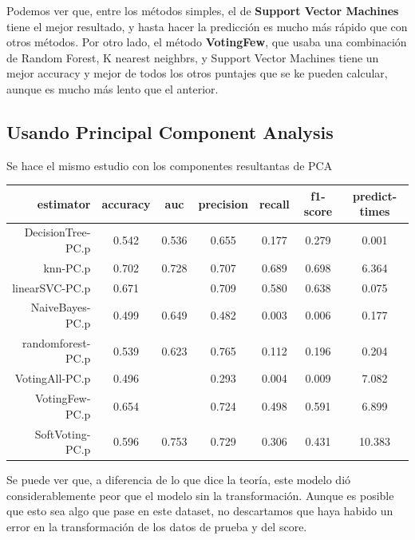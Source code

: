 \documentclass{article}
\begin{document}
Podemos ver que, entre los métodos simples, el de \textbf{Support Vector Machines} tiene el mejor resultado, y hasta hacer la predicción es mucho más rápido que con otros métodos. Por otro lado, el método \textbf{VotingFew}, que usaba una combinación de Random Forest, K nearest neighbrs, y Support Vector Machines tiene un mejor accuracy y mejor de todos los otros puntajes que se ke pueden calcular, aunque es mucho más lento que el anterior.

\subsection{Usando Principal Component Analysis}

Se hace el mismo estudio con los componentes resultantas de PCA

\begin{center}
\begin{tabular}{r c c c c c c}
	\toprule
	\textbf{estimator} & \textbf{accuracy} & \textbf{auc} & \textbf{precision} & \textbf{recall} & \textbf{f1-score} & \textbf{predict-times} \\
	\midrule
	DecisionTree-PC.p & 0.542 & 0.536 & 0.655 & 0.177 & 0.279 & 0.001 \\
	knn-PC.p & 0.702 & 0.728 & 0.707 & 0.689 & 0.698 & 6.364 \\
	linearSVC-PC.p & 0.671 & \footnotemark[1] & 0.709 & 0.580 & 0.638 & 0.075 \\
	NaiveBayes-PC.p & 0.499 & 0.649 & 0.482 & 0.003 & 0.006 & 0.177 \\
	randomforest-PC.p & 0.539 & 0.623 & 0.765 & 0.112 & 0.196 & 0.204 \\
	VotingAll-PC.p & 0.496 & \footnotemark[1] & 0.293 & 0.004 & 0.009 & 7.082 \\
	VotingFew-PC.p & 0.654 & \footnotemark[1] & 0.724 & 0.498 & 0.591 & 6.899 \\
	SoftVoting-PC.p & 0.596 & 0.753 & 0.729 & 0.306 & 0.431 & 10.383 \\
	\bottomrule
\end{tabular}
\end{center}

Se puede ver que, a diferencia de lo que dice la teoría, este modelo dió considerablemente peor que el modelo sin la transformación. Aunque es posible que esto sea algo que pase en este dataset, no descartamos que haya habido un error en la transformación de los datos de prueba y del score.

\end{document}
